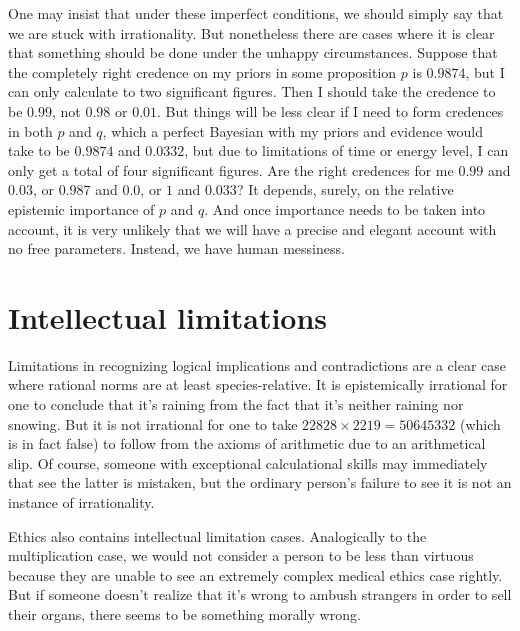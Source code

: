 One may insist that under these imperfect conditions, we should simply say that we are stuck with irrationality.
But nonetheless there are cases where it is clear that something should be done under the unhappy circumstances.
Suppose that the completely right credence on my priors in some proposition $p$ is $0.9874$, 
but I can only calculate to two significant figures. Then I should take the credence to be $0.99$, not $0.98$ or 
$0.01$. But things will be less clear if I need to form credences in both $p$ and $q$, which a perfect Bayesian
with my priors and evidence would take to be $0.9874$ and $0.0332$, but due to limitations of
time or energy level, I can only get a total of four significant figures. Are the right credences for me $0.99$
and $0.03$, or $0.987$ and $0.0$, or $1$ and $0.033$? It depends, surely, on the relative epistemic importance of $p$ and
$q$. And once importance needs to be taken into account, it is very unlikely that we will have a precise and elegant
account with no free parameters. Instead, we have human messiness.

\section{Intellectual limitations}
Limitations in recognizing logical implications and contradictions are a clear case where rational norms are at
least species-relative. It is epistemically irrational for one to conclude that it's raining from the fact that it's neither 
raining nor snowing. But it is not irrational for one to take $22828 \times 2219 = 50645332$ (which is in fact
false) to follow from the axioms of arithmetic due to an arithmetical slip. Of course, someone with 
exceptional calculational skills may immediately that see the latter is mistaken, but the ordinary person's failure to see it is 
not an instance of irrationality. 

Ethics also contains intellectual limitation cases. Analogically to the multiplication
case, we would not consider a person to be less than virtuous because they are unable to see an extremely complex medical 
ethics case rightly. But if someone doesn't realize that it's wrong to ambush strangers in order to sell their organs,
there seems to be something morally wrong.

